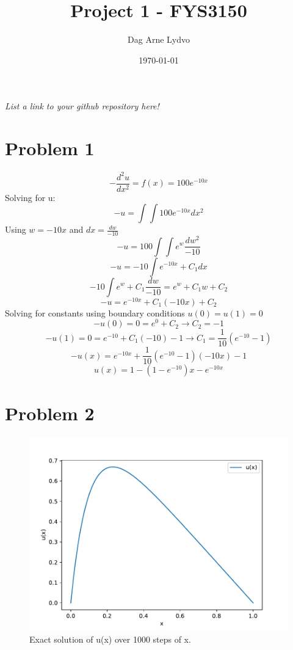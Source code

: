 \documentclass[english,notitlepage]{revtex4-1}  %
\begin{document}
\title{Project 1 - FYS3150}      %
\author{Dag Arne Lydvo}          %
\date{\today}                             %
\noaffiliation                            %


\maketitle 
    
\textit{List a link to your github repository here!}
    
\section*{Problem 1}

\[-\frac{d^2u}{dx^2}=f(x)=100e^{-10x} \]
Solving for u:
\[-u = \int\int 100e^{-10x} dx^2\]
Using $w = -10x$ and $dx=\frac{dw}{-10}$
\[-u = 100\int\int e^{w}\frac{dw^2}{-10}\]
\[ -u = -10 \int e^{-10x}+C_1 dx\]
\[-10\int e^w +C_1 \frac{dw}{-10} = e^w + C_1w + C_2\]
\[-u = e^{-10x} +C_1(-10x)+C_2\]
Solving for constants using boundary conditions $u(0)=u(1)=0$
\[-u(0)=0=e^0 +C_2 \rightarrow C_2=-1\]
\[-u(1)=0=e^{-10}+C_1(-10)-1 \rightarrow C_1=\frac{1}{10}(e^{-10}-1)\]
\[-u(x) = e^{-10x}+\frac{1}{10}(e^{-10}-1)(-10x)-1\]
\[u(x)=1-(1-e^{-10})x - e^{-10x}\]
\section*{Problem 2}
\begin{figure}
	\centering
	\includegraphics[scale=0.75]{../Figures/problem_2.pdf}
	\caption{Exact solution of u(x) over 1000 steps of x.}
\end{figure}
\end{document}
